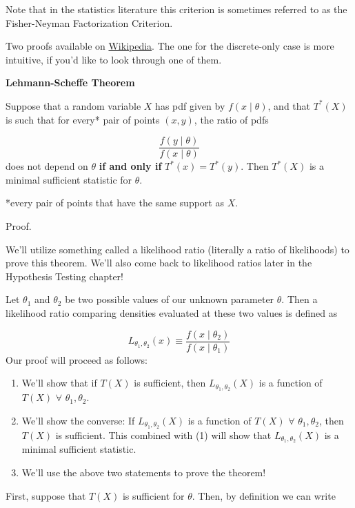 \documentclass[
  letterpaper,
  DIV=11,
  numbers=noendperiod]{scrreprt}
\begin{document}
Note that in the statistics literature this criterion is sometimes
referred to as the Fisher-Neyman Factorization Criterion.

Two proofs available on
\href{https://en.wikipedia.org/wiki/Sufficient_statistic\#Proof}{Wikipedia}.
The one for the discrete-only case is more intuitive, if you'd like to
look through one of them.

\textbf{Lehmann-Scheffe Theorem}

Suppose that a random variable \(X\) has pdf given by
\(f(x \mid \theta)\), and that \(T^*(X)\) is such that for every* pair
of points \((x,y)\), the ratio of pdfs

\[
\frac{f(y \mid \theta)}{f(x \mid \theta)}
\] does not depend on \(\theta\) \textbf{if and only if}
\(T^*(x) = T^*(y)\). Then \(T^*(X)\) is a minimal sufficient statistic
for \(\theta\).

*every pair of points that have the same support as \(X\).

Proof.

We'll utilize something called a likelihood ratio (literally a ratio of
likelihoods) to prove this theorem. We'll also come back to likelihood
ratios later in the Hypothesis Testing chapter!

Let \(\theta_1\) and \(\theta_2\) be two possible values of our unknown
parameter \(\theta\). Then a likelihood ratio comparing densities
evaluated at these two values is defined as

\[
L_{\theta_1, \theta_2}(x) \equiv \frac{f(x \mid \theta_2)}{f(x \mid \theta_1)}
\] Our proof will proceed as follows:

\begin{enumerate}
\def\labelenumi{\arabic{enumi}.}
\item
  We'll show that if \(T(X)\) is sufficient, then
  \(L_{\theta_1, \theta_2}(X)\) is a function of \(T(X)\) \(\forall\)
  \(\theta_1, \theta_2\).
\item
  We'll show the converse: If \(L_{\theta_1, \theta_2}(X)\) is a
  function of \(T(X)\) \(\forall\) \(\theta_1, \theta_2\), then \(T(X)\)
  is sufficient. This combined with (1) will show that
  \(L_{\theta_1, \theta_2}(X)\) is a minimal sufficient statistic.
\item
  We'll use the above two statements to prove the theorem!
\end{enumerate}

First, suppose that \(T(X)\) is sufficient for \(\theta\). Then, by
definition we can write
\end{document}
